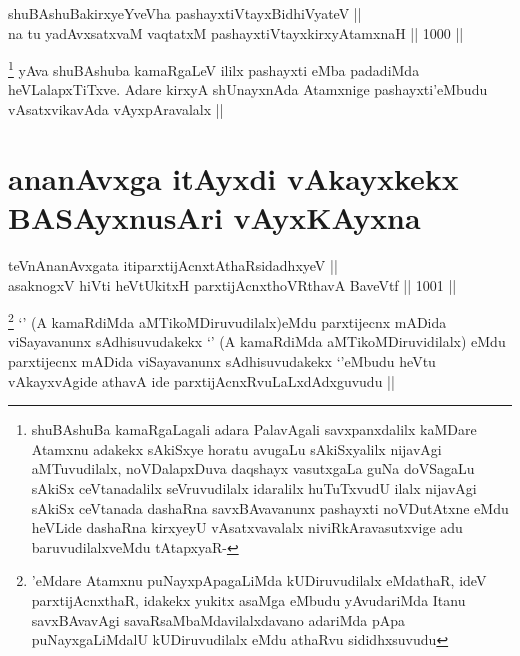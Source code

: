 
\begin{shl}
shuBAshuBakirxyeYveVha pashayxtiVtayxBidhiVyateV || \\
na tu yadAvxsatxvaM vaqtatxM pashayxtiVtayxkirxyAtamxnaH ||  1000 ||  
\end{shl}

\begin{artha}
\footnote{shuBAshuBa kamaRgaLagali adara PalavAgali savxpanxdalilx kaMDare Atamxnu adakekx sAkiSxye horatu avugaLu sAkiSxyalilx nijavAgi aMTuvudilalx, noVDalapxDuva daqshayx vasutxgaLa guNa doVSagaLu sAkiSx ceVtanadalilx seVruvudilalx idaralilx huTuTxvudU ilalx nijavAgi sAkiSx ceVtanada dashaRna savxBAvavanunx pashayxti noVDutAtxne eMdu heVLide dashaRna kirxyeyU vAsatxvavalalx niviRkAravasutxvige adu baruvudilalxveMdu tAtapxyaR-}
yAva shuBAshuba kamaRgaLeV ililx pashayxti eMba padadiMda heVLalapxTiTxve. Adare kirxyA shUnayxnAda Atamxnige pashayxti'eMbudu vAsatxvikavAda vAyxpAravalalx ||
\end{artha}

\section*{ananAvxga itAyxdi vAkayxkekx BASAyxnusAri vAyxKAyxna}


\begin{shl}
teVnAnanAvxgata itiparxtijAcnxtAthaRsidadhxyeV ||  \\
asaknogxV hiVti heVtUkitxH parxtijAcnxthoVR\s thavA BaveVtf ||  1001 || 
\end{shl}

\begin{artha}
\footnote{\stext'eMdare Atamxnu puNayxpApagaLiMda kUDiruvudilalx eMdathaR, ideV parxtijAcnxthaR, idakekx yukitx asaMga eMbudu yAvudariMda Itanu savxBAvavAgi savaRsaMbaMdavilalxdavano adariMda pApa puNayxgaLiMdalU kUDiruvudilalx eMdu athaRvu sididhxsuvudu}
`\stext' (A kamaRdiMda aMTikoMDiruvudilalx)eMdu parxtijecnx mADida viSayavanunx sAdhisuvudakekx `\stext' (A kamaRdiMda aMTikoMDiruvidilalx) eMdu parxtijecnx mADida viSayavanunx sAdhisuvudakekx `\stext'eMbudu heVtu vAkayxvAgide athavA ide parxtijAcnxRvuLaLxdAdxguvudu ||
\end{artha}


